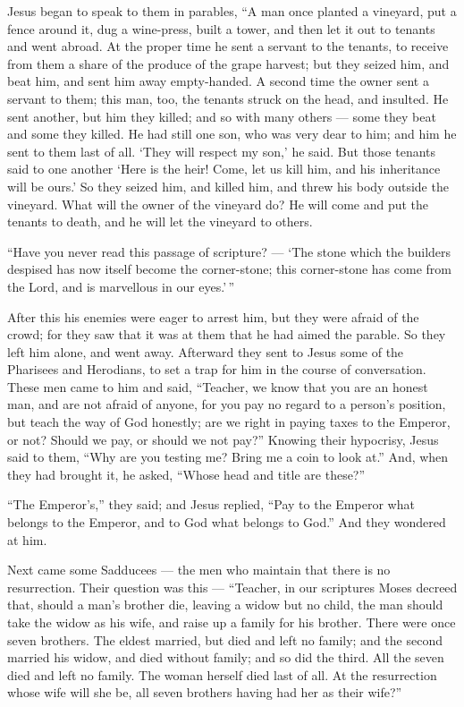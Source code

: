  Jesus began to speak to them in parables, ``A man once
planted a vineyard, put a fence around it, dug a wine-press, built a
tower, and then let it out to tenants and went abroad.  At
the proper time he sent a servant to the tenants, to receive from them a
share of the produce of the grape harvest;  but they seized
him, and beat him, and sent him away empty-handed.  A second
time the owner sent a servant to them; this man, too, the tenants struck
on the head, and insulted.  He sent another, but him they
killed; and so with many others --- some they beat and some they killed.
 He had still one son, who was very dear to him; and him he
sent to them last of all. `They will respect my son,' he said.
 But those tenants said to one another `Here is the heir!
Come, let us kill him, and his inheritance will be ours.' 
So they seized him, and killed him, and threw his body outside the
vineyard.  What will the owner of the vineyard do? He will
come and put the tenants to death, and he will let the vineyard to
others.

 ``Have you never read this passage of scripture? --- `The
stone which the builders despised has now itself become the
corner-stone;  this corner-stone has come from the Lord,
and is marvellous in our eyes.'\,''

 After this his enemies were eager to arrest him, but they
were afraid of the crowd; for they saw that it was at them that he had
aimed the parable. So they left him alone, and went away. 
Afterward they sent to Jesus some of the Pharisees and Herodians, to set
a trap for him in the course of conversation.  These men
came to him and said, ``Teacher, we know that you are an honest man, and
are not afraid of anyone, for you pay no regard to a person's position,
but teach the way of God honestly; are we right in paying taxes to the
Emperor, or not?  Should we pay, or should we not pay?''
Knowing their hypocrisy, Jesus said to them, ``Why are you testing me?
Bring me a coin to look at.''  And, when they had brought
it, he asked, ``Whose head and title are these?''

``The Emperor's,'' they said;  and Jesus replied, ``Pay to
the Emperor what belongs to the Emperor, and to God what belongs to
God.'' And they wondered at him.

 Next came some Sadducees --- the men who maintain that
there is no resurrection. Their question was this --- 
``Teacher, in our scriptures Moses decreed that, should a man's brother
die, leaving a widow but no child, the man should take the widow as his
wife, and raise up a family for his brother.  There were
once seven brothers. The eldest married, but died and left no family;
 and the second married his widow, and died without family;
and so did the third.  All the seven died and left no
family. The woman herself died last of all.  At the
resurrection whose wife will she be, all seven brothers having had her
as their wife?''

